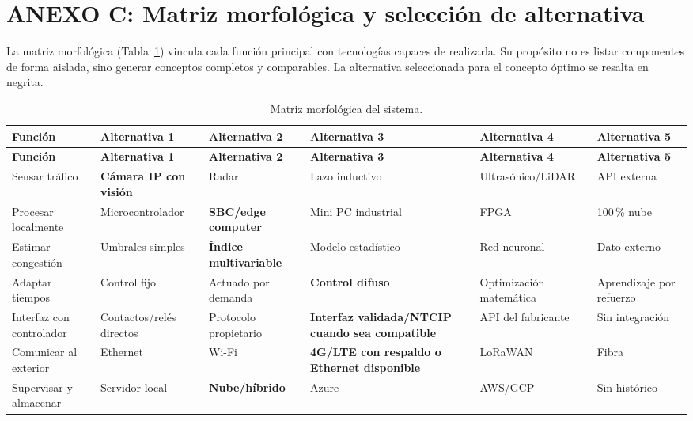 \section*{ANEXO C: Matriz morfológica y selección de alternativa}
\label{anexo:matriz-morfologica}

La matriz morfológica (Tabla~\ref{tab:matriz-morfologica}) vincula cada función principal con tecnologías
capaces de realizarla. Su propósito no es listar componentes de forma aislada, sino generar conceptos
completos y comparables. La alternativa seleccionada para el concepto óptimo se resalta en negrita.

\begin{landscape}
\footnotesize
\begin{longtable}{@{}p{3.8cm}p{3.8cm}p{3.8cm}p{3.8cm}p{3.8cm}p{3.8cm}@{}}
\caption{Matriz morfológica del sistema.}\label{tab:matriz-morfologica}\\
\toprule
\textbf{Función} & \textbf{Alternativa 1} & \textbf{Alternativa 2} & \textbf{Alternativa 3} & \textbf{Alternativa 4} & \textbf{Alternativa 5}\\
\midrule
\endfirsthead
\toprule
\textbf{Función} & \textbf{Alternativa 1} & \textbf{Alternativa 2} & \textbf{Alternativa 3} & \textbf{Alternativa 4} & \textbf{Alternativa 5}\\
\midrule
\endhead
\bottomrule
\endfoot
Sensar tráfico & \textbf{Cámara IP con visión} & Radar & Lazo inductivo & Ultrasónico/LiDAR & API externa\\
Procesar localmente & Microcontrolador & \textbf{SBC/edge computer} & Mini PC industrial & FPGA & 100\,\% nube\\
Estimar congestión & Umbrales simples & \textbf{Índice multivariable} & Modelo estadístico & Red neuronal & Dato externo\\
Adaptar tiempos & Control fijo & Actuado por demanda & \textbf{Control difuso} & Optimización matemática & Aprendizaje por refuerzo\\
Interfaz con controlador & Contactos/relés directos & Protocolo propietario & \textbf{Interfaz validada/NTCIP cuando sea compatible} & API del fabricante & Sin integración\\
Comunicar al exterior & Ethernet & Wi-Fi & \textbf{4G/LTE con respaldo o Ethernet disponible} & LoRaWAN & Fibra\\
Supervisar y almacenar & Servidor local & \textbf{Nube/híbrido} & Azure & AWS/GCP & Sin histórico\\

\end{longtable}
\end{landscape}
